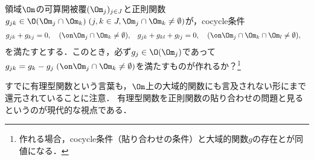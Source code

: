 \documentclass[uplatex, dvipdfmx]{jsreport}
\begin{document}
\begin{problem}[Cousin I：]\label{problem-Cousin-I}
    領域$\Om$の可算開被覆$(\Om_j)_{j\in J}$と正則関数$g_{jk}\in\O(\Om_j\cap\Om_k)\;(j,k\in J,\Om_j\cap\Om_k\ne\emptyset)$が，cocycle条件
    \begin{align*}
        g_{jk}+g_{kj}&=0,\quad(\on\Om_j\cap\Om_k\ne\emptyset),&g_{jk}+g_{kl}+g_{lj}&=0,\quad(\on\Om_j\cap\Om_k\cap\Om_l\ne\emptyset),
    \end{align*}
    を満たすとする．このとき，必ず$g_j\in\O(\Om_j)$であって$g_{jk}=g_k-g_j\;(\on\Om_j\cap\Om_k\ne\emptyset)$を満たすものが作れるか？\footnote{作れる場合，cocycle条件（貼り合わせの条件）と大域的関数$g$の存在とが同値になる．}
\end{problem}
\begin{remark}
    すでに有理型関数という言葉も，$\Om$上の大域的関数にも言及されない形にまで還元されていることに注意．
    有理型関数を正則関数の貼り合わせの問題と見るというのが現代的な視点である．
\end{remark}
\end{document}
